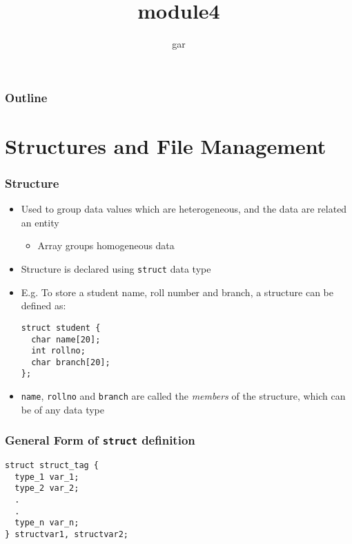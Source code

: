 \documentclass[11pt]{beamer}
\title{module4}
\author{gar}
\date{}
\begin{document}
\maketitle

\begin{frame}
\frametitle{Outline}
\setcounter{tocdepth}{3}
\tableofcontents
\end{frame}
\section{Structures and File Management}
\label{sec-1}
\begin{frame}[fragile]\frametitle{Structure}
\label{sec-1-1}

\begin{itemize}
\item Used to group data values which are heterogeneous, and the data are related an entity
\begin{itemize}
\item Array groups homogeneous data
\end{itemize}
\item Structure is declared using \verb~struct~ data type
\item E.g. To store a student name, roll number and branch, a structure can be defined as:

\begin{verbatim}
struct student {
  char name[20];
  int rollno;
  char branch[20];
};
\end{verbatim}
\item \verb~name~, \verb~rollno~ and \verb~branch~ are called the \emph{members} of the structure, which can be of any data type
\end{itemize}
\end{frame}
\begin{frame}[fragile]\frametitle{General Form of \verb~struct~ definition}
\label{sec-1-2}


\begin{verbatim}
struct struct_tag {
  type_1 var_1;
  type_2 var_2;
  .
  .
  type_n var_n;
} structvar1, structvar2;
\end{verbatim}
\end{frame}
\end{document}
